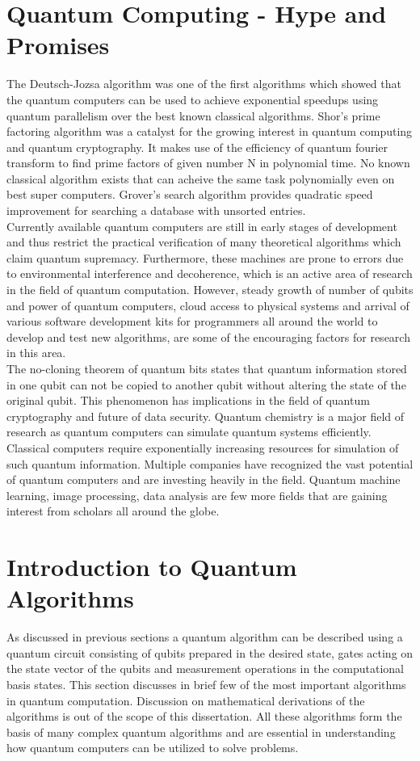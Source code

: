 \documentclass[english,a4paper,11pt,oneside,onecolumn]{book}
\begin{document}
\section{Quantum Computing - Hype and Promises}
\label{sec:qHype}
The Deutsch-Jozsa algorithm was one of the first algorithms which showed that the quantum computers can be used to achieve exponential speedups using quantum parallelism over the best known classical algorithms. Shor's prime factoring algorithm was a catalyst for the growing interest in quantum computing and quantum cryptography. It makes use of the efficiency of quantum fourier transform to find prime factors of given number N in polynomial time. No known classical algorithm exists that can acheive the same task polynomially even on best super computers. Grover's search algorithm provides quadratic speed improvement for searching a database with unsorted entries.\\

\noindent Currently available quantum computers are still in early stages of development and thus restrict the practical verification of many theoretical algorithms which claim quantum supremacy. Furthermore, these machines are prone to errors due to environmental interference and decoherence, which is an active area of research in the field of quantum computation. However, steady growth of number of qubits and power of quantum computers, cloud access to physical systems and arrival of various software development kits for programmers all around the world to develop and test new algorithms, are some of the encouraging factors for research in this area.\\

\noindent The no-cloning theorem of quantum bits states that quantum information stored in one qubit can not be copied to another qubit without altering the state of the original qubit. This phenomenon has implications in the field of quantum cryptography and future of data security. Quantum chemistry is a major field of research as quantum computers can simulate quantum systems efficiently. Classical computers require exponentially increasing resources for simulation of such quantum information. Multiple companies have recognized the vast potential of quantum computers and are investing heavily in the field. Quantum machine learning, image processing, data analysis are few more fields that are gaining interest from scholars all around the globe.

\section{Introduction to Quantum Algorithms}
\label{sec:qAlgo}
As discussed in previous sections a quantum algorithm can be described using a quantum circuit consisting of qubits prepared in the desired state, gates acting on the state vector of the qubits and measurement operations in the computational basis states. This section discusses in brief few of the most important algorithms in quantum computation. Discussion on mathematical derivations of the algorithms is out of the scope of this dissertation. All these algorithms form the basis of many complex quantum algorithms and are essential in understanding how quantum computers can be utilized to solve problems.
\end{document}
